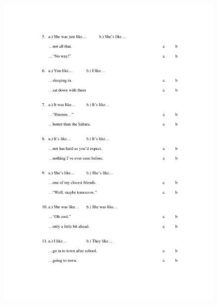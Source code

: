 \begin{figure}[htbp]
	\centering
		\includegraphics[width=5in]{images/Exp1page2.pdf}
		\label{x1p2}
\end{figure}

